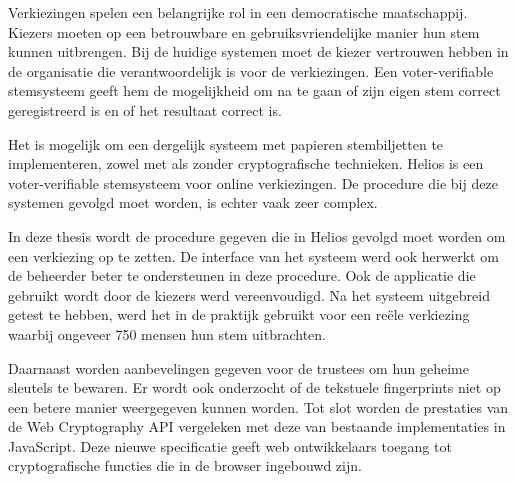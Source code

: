 % 
%

Verkiezingen spelen een belangrijke rol in een democratische maatschappij. Kiezers moeten op een betrouwbare en gebruiksvriendelijke manier hun stem kunnen uitbrengen. Bij de huidige systemen moet de kiezer vertrouwen hebben in de organisatie die verantwoordelijk is voor de verkiezingen. Een voter-verifiable stemsysteem geeft hem de mogelijkheid om na te gaan of zijn eigen stem correct geregistreerd is en of het resultaat correct is.

\npar Het is mogelijk om een dergelijk systeem met papieren stembiljetten te implementeren, zowel met als zonder cryptografische technieken. Helios is een voter-verifiable stemsysteem voor online verkiezingen. De procedure die bij deze systemen gevolgd moet worden, is echter vaak zeer complex.

\npar In deze thesis wordt de procedure gegeven die in Helios gevolgd moet worden om een verkiezing op te zetten. De interface van het systeem werd ook herwerkt om de beheerder beter te ondersteunen in deze procedure. Ook de applicatie die gebruikt wordt door de kiezers werd vereenvoudigd. Na het systeem uitgebreid getest te hebben, werd het in de praktijk gebruikt voor een re\"ele verkiezing waarbij ongeveer 750 mensen hun stem uitbrachten.

\npar Daarnaast worden aanbevelingen gegeven voor de trustees om hun geheime sleutels te bewaren. Er wordt ook onderzocht of de tekstuele fingerprints niet op een betere manier weergegeven kunnen worden. Tot slot worden de prestaties van de Web Cryptography API vergeleken met deze van bestaande implementaties in JavaScript. Deze nieuwe specificatie geeft web ontwikkelaars toegang tot cryptografische functies die in de browser ingebouwd zijn.